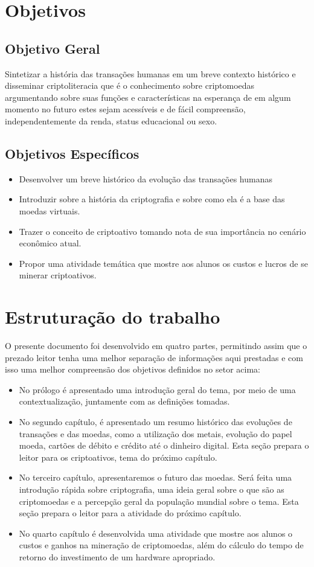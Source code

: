 \section{Objetivos} \label{objetivos}
\subsection{Objetivo Geral}
Sintetizar a história das transações humanas em um breve contexto histórico e disseminar criptoliteracia que é o conhecimento sobre criptomoedas argumentando sobre suas funções e características na esperança de em algum momento no futuro estes sejam acessíveis e de fácil compreensão, independentemente da renda, status educacional ou sexo.  

\subsection{Objetivos Específicos}

\begin{itemize}
	\item Desenvolver um breve histórico da evolução das transações humanas 
	\item Introduzir sobre a história da criptografia e sobre como ela é a base das moedas virtuais.
	\item Trazer o conceito de criptoativo tomando nota de sua importância no cenário econômico atual.  
	\item Propor uma atividade temática que mostre aos alunos os custos e lucros de se minerar criptoativos. 
\end{itemize}

\section{Estruturação do trabalho}
O presente documento foi desenvolvido em quatro partes, permitindo assim que o prezado leitor tenha uma melhor separação de informações aqui prestadas e com isso uma melhor compreensão dos 
objetivos definidos no setor acima: 
\begin{itemize}
	\item No prólogo é apresentado uma introdução geral do tema, por meio de uma
	contextualização, juntamente com as definições tomadas. 
	\item No segundo capítulo, é apresentado um resumo histórico das evoluções de transações e das moedas, como a utilização dos metais, evolução do papel moeda, cartões de débito e crédito até o dinheiro digital. Esta seção prepara o leitor para os criptoativos, tema do próximo capítulo.
	\item No terceiro capítulo, apresentaremos o futuro das moedas. Será feita uma introdução rápida sobre criptografia, uma ideia geral sobre o que são as criptomoedas e a percepção geral da população mundial sobre o tema. Esta seção prepara o leitor para a atividade do próximo capítulo.
	\item No quarto capítulo é desenvolvida uma atividade que mostre aos alunos o custos e ganhos na mineração de criptomoedas, além do cálculo do tempo de retorno do investimento de um hardware apropriado.
	\end{itemize}


